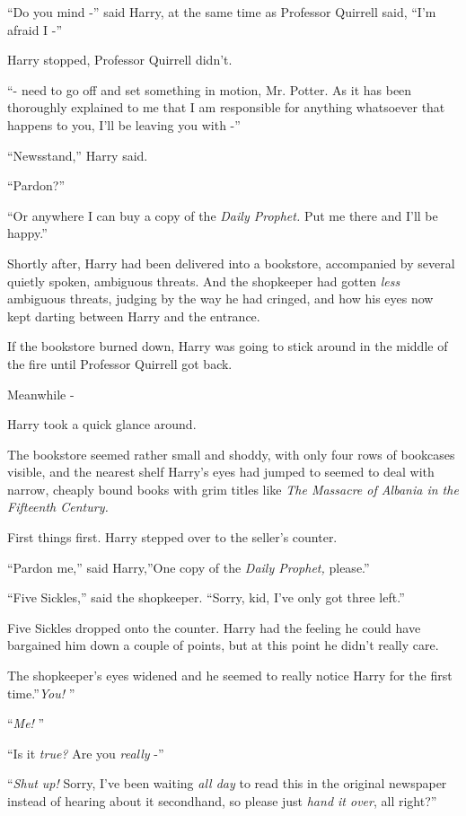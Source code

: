 ``Do you mind -'' said Harry, at the same time as Professor Quirrell
said, ``I'm afraid I -''

Harry stopped, Professor Quirrell didn't.

``- need to go off and set something in motion, Mr. Potter. As it has
been thoroughly explained to me that I am responsible for anything
whatsoever that happens to you, I'll be leaving you with -''

``Newsstand,'' Harry said.

``Pardon?''

``Or anywhere I can buy a copy of the \emph{Daily Prophet.} Put me there
and I'll be happy.''

Shortly after, Harry had been delivered into a bookstore, accompanied by
several quietly spoken, ambiguous threats. And the shopkeeper had gotten
\emph{less} ambiguous threats, judging by the way he had cringed, and
how his eyes now kept darting between Harry and the entrance.

If the bookstore burned down, Harry was going to stick around in the
middle of the fire until Professor Quirrell got back.

Meanwhile -

Harry took a quick glance around.

The bookstore seemed rather small and shoddy, with only four rows of
bookcases visible, and the nearest shelf Harry's eyes had jumped to
seemed to deal with narrow, cheaply bound books with grim titles like
\emph{The Massacre of Albania in the Fifteenth Century.}

First things first. Harry stepped over to the seller's counter.

``Pardon me,'' said Harry,''One copy of the \emph{Daily Prophet,}
please.''

``Five Sickles,'' said the shopkeeper. ``Sorry, kid, I've only got three
left.''

Five Sickles dropped onto the counter. Harry had the feeling he could
have bargained him down a couple of points, but at this point he didn't
really care.

The shopkeeper's eyes widened and he seemed to really notice Harry for
the first time.''\emph{You!} ''

``\emph{Me!} ''

``Is it \emph{true?} Are you \emph{really} -''

``\emph{Shut up!} Sorry, I've been waiting \emph{all day} to read this in
the original newspaper instead of hearing about it secondhand, so please
just \emph{hand it over}, all right?''

